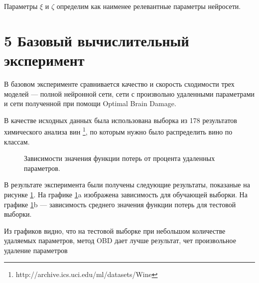 \documentclass[12pt,twoside]{article}
\begin{document}
Параметры  $\xi$ и $\zeta$ определим как наименее релевантные параметры нейросети.


\section{5 Базовый вычислительный эксперимент}

	В базовом эксперименте сравнивается качество и скорость сходимости трех моделей --- полной нейронной сети, сети с произвольно удаленными параметрами и сети полученной при помощи Optimal Brain Damage.
	
	В качестве исходных данных была использована выборка из 178  результатов химического анализа вин \footnote{http://archive.ics.uci.edu/ml/datasets/Wine}, по которым нужно было распределить вино по классам.

\begin{figure}[!htb]
	\caption{
		Зависимости значения функции потерь от процента удаленных параметров.
	}
	\label{results}
\end{figure}

	В результате эксперимента были получены следующие результаты, показаные на рисунке \ref{results}. На графике \ref{results}a изображена зависимость для обучающей выборки. На графике \ref{results}b --- зависимость среднего значения функции потерь для тестовой выборки.
	
	Из графиков видно, что на тестовой выборке при небольшом количестве удаляемых параметров, метод OBD дает лучше результат, чет произвольное удаление параметров



\end{document}
